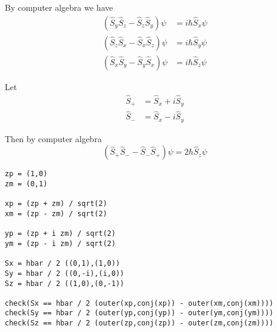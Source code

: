 By computer algebra we have
\begin{align*}
(\hat S_y\hat S_z-\hat S_z\hat S_y)\psi&=i\hbar\hat S_x\psi
\\
(\hat S_z\hat S_x-\hat S_x\hat S_z)\psi&=i\hbar\hat S_y\psi
\\
(\hat S_x\hat S_y-\hat S_y\hat S_x)\psi&=i\hbar\hat S_z\psi
\end{align*}

Let
\begin{align*}
\hat S_+&=\hat S_x+i\hat S_y
\\
\hat S_-&=\hat S_x-i\hat S_y
\end{align*}

Then by computer algebra
\begin{equation*}
(\hat S_+\hat S_--\hat S_-\hat S_+)\psi=2\hbar\hat S_z\psi
\end{equation*}

\newpage
{}

{\footnotesize\begin{verbatim}
zp = (1,0)
zm = (0,1)

xp = (zp + zm) / sqrt(2)
xm = (zp - zm) / sqrt(2)

yp = (zp + i zm) / sqrt(2)
ym = (zp - i zm) / sqrt(2)

Sx = hbar / 2 ((0,1),(1,0))
Sy = hbar / 2 ((0,-i),(i,0))
Sz = hbar / 2 ((1,0),(0,-1))

check(Sx == hbar / 2 (outer(xp,conj(xp)) - outer(xm,conj(xm))))
check(Sy == hbar / 2 (outer(yp,conj(yp)) - outer(ym,conj(ym))))
check(Sz == hbar / 2 (outer(zp,conj(zp)) - outer(zm,conj(zm))))
\end{verbatim}}

